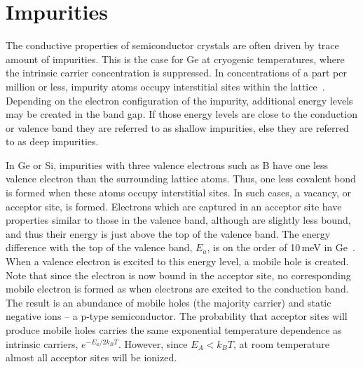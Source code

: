 \section{Impurities}\label{sec:impurities}

The conductive properties of semiconductor crystals are often driven by trace amount of impurities. This is the case for Ge at cryogenic temperatures, where the intrinsic carrier concentration is suppressed. In concentrations of a part per million or less, impurity atoms occupy interstitial sites within the lattice~\cite{knoll}. Depending on the electron configuration of the impurity, additional energy levels may be created in the band gap. If those energy levels are close to the conduction or valence band they are referred to as shallow impurities, else they are referred to as deep impurities. 

In Ge or Si, impurities with three valence electrons such as B have one less valence electron than the surrounding lattice atoms. Thus, one less covalent bond is formed when these atoms occupy interstitial sites. In such cases, a vacancy, or acceptor site, is formed. Electrons which are captured in an acceptor site have properties similar to those in the valence band, although are slightly less bound, and thus their energy is just above the top of the valence band. The energy difference with the top of the valence band, $E_a$, is on the order of 10\,meV in Ge~\cite{kittel}. When a valence electron is excited to this energy level, a mobile hole is created. Note that since the electron is now bound in the acceptor site, no corresponding mobile electron is formed as when electrons are excited to the conduction band. The result is an abundance of mobile holes (the majority carrier) and static negative ions -- a p-type semiconductor. The probability that acceptor sites will produce mobile holes carries the same exponential temperature dependence as intrinsic carriers, $e^{-E_a/2k_BT}$. However, since $E_{A} < k_BT$, at room temperature almost all acceptor sites will be ionized. 

